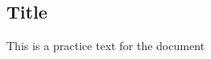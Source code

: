 
\subsection{Title}

\begin{flushleft}
    This is a practice text for the document 
\end{flushleft}
